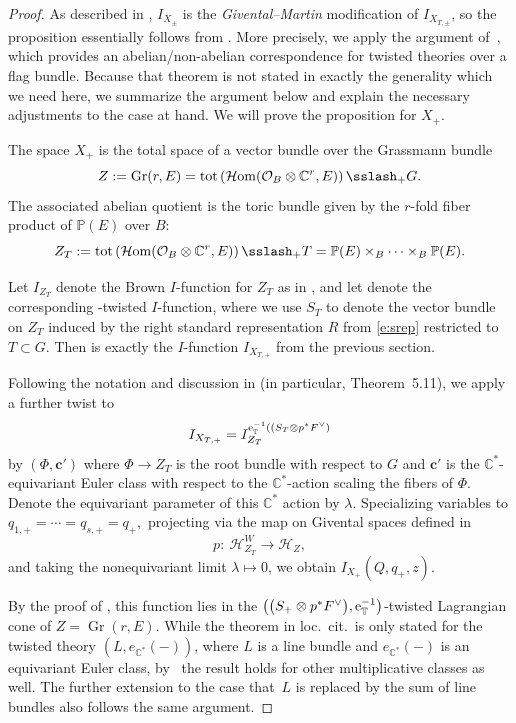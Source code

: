 \documentclass[pdftex]{sigma}
\numberwithin{equation}{section}
\newcommand{\cc}[1]{\mathcal{#1}} %
\newcommand{\CC}{\mathbb{C}}
\newcommand{\PP}{\mathbb{P}}
\newcommand{\torus}{\mathbb{T}}
\DeclareMathOperator{\tot}{tot}
\DeclareMathOperator{\Gr}{Gr}
\newcommand{\F}{F}
\newcommand{\E}{E}
\begin{document}
\begin{proof}

As described in \cite{CLS}, $I_{X_\pm}$ is the \emph{Givental--Martin} modification of $I_{X_{T, \pm}}$, so the proposition essentially follows from \cite[Theorem 1.11]{CLS}.
More precisely, we apply the argument of~\mbox{\cite[Theorem~5.11]{CLS}}, which provides an abelian/non-abelian correspondence for twisted theories over a flag bundle. Because that theorem is not stated in exactly the generality which we need here, we summarize the argument below and explain the necessary adjustments to the case at hand. We will prove the proposition for $X_+$.

The space $X_+$ is the total space of a vector bundle over the Grassmann bundle
\[
Z := \Gr(r, \E) = \tot\left(\mathcal{H}{\rm om}(\cc O_B \otimes \CC^r, \E)\right) \sslash_+ G.
\]
The associated abelian quotient is the toric bundle given by the $r$-fold fiber product of $\PP(\E)$ over $B$:
\[
Z_T := \tot\left(\mathcal{H}{\rm om}(\cc O_B \otimes \CC^r, \E)\right) \sslash_+ T = \PP(\E) \times_B \cdots \times_B \PP(\E).
\]

Let $I_{Z_T}$ denote the Brown $I$-function for $Z_T$ as in \cite{Brown}, and let
\smash{$I_{Z_T}^{e_\torus^{-1}( (S_T \otimes p^*\F^\vee))}$} denote the corresponding
\smash{$\bigl(\bigl(S_T \otimes p^*\F^\vee\bigr), {\rm e}^{-1}_{\torus}(-)\bigr)$}-twisted $I$-function, where we use $S_T$ to denote the vector bundle on $Z_T$ induced by the right standard representation $R$ from \eqref{e:srep} restricted to $T \subset G$. Then \raisebox{-1pt}{\smash{$I_{Z_T}^{e_\torus^{-1}( (S_T \otimes p^*\F^\vee))}$}} is exactly the $I$-function $I_{X_{T,+}}$ from the previous section.

Following the notation and discussion in \cite[Section~5.2]{CLS} (in particular, Theorem~5.11), we apply a further twist to
\[
I_{X_{T,+}} = I_{Z_T}^{ {\rm e}^{-1}_{\torus}( (S_T \otimes p^*\F^\vee)}
\]
by $(\Phi, \mathbf c')$ where $\Phi \to Z_T$ is the root bundle with respect to $G$ and $\mathbf c'$ is the $\CC^*$-equivariant Euler class
with respect to the $\CC^*$-action scaling the fibers of $\Phi$. Denote the equivariant parameter of this $\CC^*$ action by $\lambda$. Specializing variables to
$q_{1, +} = \cdots = q_{s, +} = q_+,$
projecting via the map on Givental spaces defined in \cite{CLS}
\[
p\colon \ \mathcal{H}_{Z_T}^W \to \mathcal{H}_{Z},
\]
and taking the nonequivariant limit $\lambda \mapsto 0$, we obtain $I_{X_+}(Q, q_+, z)$.


By the proof of \cite[Theorem~5.11]{CLS}, this function lies in the $\bigl(\bigl(S_+ \otimes p^*\F^\vee\bigr), {\rm e}^{-1}_{\torus}\bigr)$-twisted Lagrangian cone of $Z = \Gr(r, \E)$. While the theorem in loc.~cit.\ is only stated for the twisted theory $( L, e_{\CC^*}(-))$, where $L$ is a line bundle and $e_{\CC^*}(-)$ is an equivariant Euler class, by~\mbox{\cite[Remark 3.7]{CLS}} the result holds for other multiplicative classes as well. The further extension to the case that~$L$ is replaced by the sum of line bundles also follows the same argument.


\end{proof}
\end{document}

